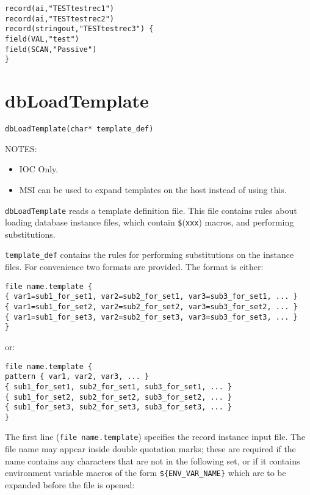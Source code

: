 \begin{verbatim}record(ai,"TESTtestrec1")
record(ai,"TESTtestrec2")
record(stringout,"TESTtestrec3") {
field(VAL,"test")
field(SCAN,"Passive")
}
\end{verbatim}

\section{dbLoadTemplate}

\begin{verbatim}dbLoadTemplate(char* template_def)
\end{verbatim}NOTES:

\begin{itemize}\item IOC Only.

\item MSI can be used to expand templates on the host instead of using this.

\end{itemize}\verb|dbLoadTemplate| reads a template definition file. This file contains rules about loading database instance files, which 
contain \verb|$|(\verb|xxx|) macros, and performing substitutions.

\verb|template_def| contains the rules for performing substitutions on the instance files. For convenience two formats are 
provided. The format is either:

\begin{verbatim}file name.template {
{ var1=sub1_for_set1, var2=sub2_for_set1, var3=sub3_for_set1, ... }
{ var1=sub1_for_set2, var2=sub2_for_set2, var3=sub3_for_set2, ... }
{ var1=sub1_for_set3, var2=sub2_for_set3, var3=sub3_for_set3, ... }
}
\end{verbatim}or:

\begin{verbatim}file name.template {
pattern { var1, var2, var3, ... }
{ sub1_for_set1, sub2_for_set1, sub3_for_set1, ... }
{ sub1_for_set2, sub2_for_set2, sub3_for_set2, ... }
{ sub1_for_set3, sub2_for_set3, sub3_for_set3, ... }
}
\end{verbatim}The first line (\verb|file name.template|) specifies the record instance input file. The file name may appear inside double 
quotation marks; these are required if the name contains any characters that are not in the following set, or if it contains 
environment variable macros of the form \verb|${ENV_VAR_NAME}| which are to be expanded before the file is opened:

